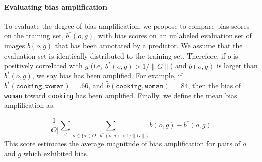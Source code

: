 \paragraph{Evaluating bias amplification} 
To evaluate the degree of bias amplification, we propose to compare bias scores on the training set, $b^*(o,g)$, with bias scores on an unlabeled evaluation set of images $\tilde{b}(o,g)$ that has been annotated by a predictor. 
We assume that the evaluation set is identically distributed to the training set. Therefore, if $o$ is positively correlated with $g$ (i.e, ${b^*}(o,g) > 1/\|G\|$) and $\tilde{b}(o,g)$ is larger than $b^*(o,g)$, we say bias has been amplified.
For example, if $b^*(\texttt{cooking}, \texttt{woman}) = .66$, and $\tilde{b}(\texttt{cooking}, \texttt{woman}) = .84$, then the bias of \texttt{woman} toward \texttt{cooking} has been amplified.
Finally, we define the mean bias amplification as:






$$\frac{1}{|O|}\sum_g \sum_{o \in \{o\in O \mid b^*(o,g) > 1/\|G\| \}} 
	\tilde{b}(o,g) - b^*(o,g). $$
This score estimates the average magnitude of bias amplification for pairs of $o$ and $g$ which exhibited bias.
